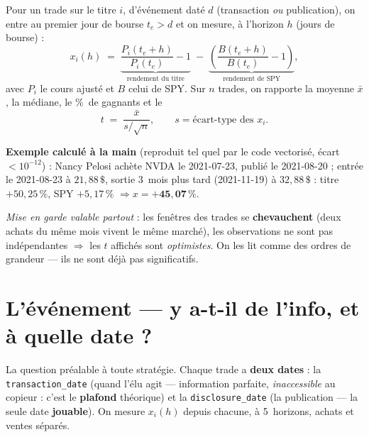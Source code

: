 \documentclass[11pt,a4paper]{article}
\newcommand{\code}[1]{\texttt{\small #1}}
\begin{document}
Pour un trade sur le titre $i$, d'événement daté $d$ (transaction \emph{ou} publication), on entre au
premier jour de bourse $t_e > d$ et on mesure, à l'horizon $h$ (jours de bourse) :
\begin{equation}
x_i(h) \;=\; \underbrace{\frac{P_i(t_e+h)}{P_i(t_e)}-1}_{\text{rendement du titre}}
\;-\; \underbrace{\left(\frac{B(t_e+h)}{B(t_e)}-1\right)}_{\text{rendement de SPY}},
\end{equation}
avec $P_i$ le cours ajusté et $B$ celui de SPY. Sur $n$ trades, on rapporte la moyenne $\bar x$, la
médiane, le \%~de gagnants et le
\begin{equation}
t \;=\; \frac{\bar x}{s/\sqrt{n}}, \qquad s = \text{écart-type des } x_i .
\end{equation}

\textbf{Exemple calculé à la main} (reproduit tel quel par le code vectorisé, écart $<10^{-12}$) : Nancy
Pelosi achète NVDA le 2021-07-23, publié le 2021-08-20 ; entrée le 2021-08-23 à $21{,}88\,\$$, sortie
3~mois plus tard (2021-11-19) à $32{,}88\,\$$ : titre $+50{,}25\,\%$, SPY $+5{,}17\,\%$
$\Rightarrow x = \mathbf{+45{,}07\,\%}$.

\emph{Mise en garde valable partout} : les fenêtres des trades se \textbf{chevauchent} (deux achats du
même mois vivent le même marché), les observations ne sont pas indépendantes $\Rightarrow$ les $t$ affichés
sont \emph{optimistes}. On les lit comme des ordres de grandeur --- ils ne sont déjà pas significatifs.

\section{L'événement --- y a-t-il de l'info, et à quelle date ?}\label{sec:evenement}

La question préalable à toute stratégie. Chaque trade a \textbf{deux dates} : la \code{transaction\_date}
(quand l'élu agit --- information parfaite, \emph{inaccessible} au copieur : c'est le \textbf{plafond}
théorique) et la \code{disclosure\_date} (la publication --- la seule date \textbf{jouable}). On mesure
$x_i(h)$ depuis chacune, à 5~horizons, achats et ventes séparés.
\end{document}
